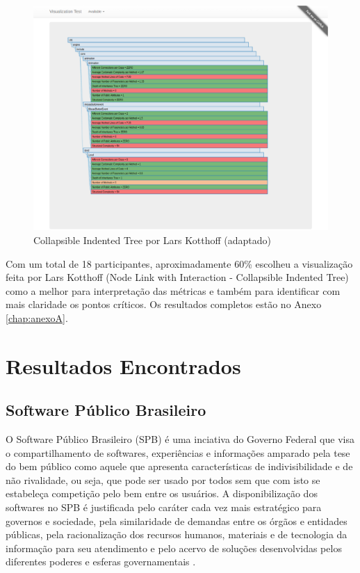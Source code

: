 \begin{figure}[!htb]
	\centering
    \includegraphics[keepaspectratio=true,scale=0.35]
    {figuras/node_link_tree_with_interaction.eps}
  \caption{Collapsible Indented Tree por Lars Kotthoff (adaptado)}
  \label{fig:node_link_tree_with_interaction}
\end{figure}

\newpage

\newpage

Com um total de 18 participantes, aproximadamente 60\% escolheu a visualização
feita por Lars Kotthoff (Node Link with Interaction - Collapsible Indented
Tree) como a melhor para interpretação das métricas e também para identificar
com mais claridade os pontos críticos. Os resultados completos estão no Anexo
\ref{chap:anexoA}.

\section{Resultados Encontrados}

\subsection{Software Público Brasileiro}

O Software Público Brasileiro (SPB) é uma inciativa do Governo Federal que visa
o compartilhamento de softwares, experiências e informações amparado pela tese
do bem público como aquele que apresenta características de indivisibilidade e
de não rivalidade, ou seja, que pode ser usado por todos sem que com isto se
estabeleça competição pelo bem entre os usuários. A disponibilização dos
softwares no SPB é justificada pelo caráter cada vez mais estratégico para
governos e sociedade, pela similaridade de demandas entre os órgãos e entidades
públicas, pela racionalização dos recursos humanos, materiais e de tecnologia
da informação para seu atendimento e pelo acervo de soluções desenvolvidas
pelos diferentes poderes e esferas governamentais \cite{santos2011in01}.

